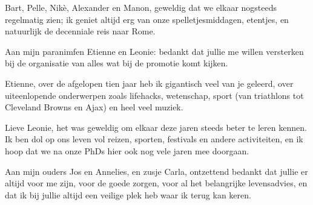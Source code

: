 Bart, Pelle, Nik\`{e}, Alexander en Manon, geweldig dat we elkaar nogsteeds regelmatig zien; ik geniet altijd erg van onze spelletjesmiddagen, etentjes, en natuurlijk de decenniale reis naar Rome. 

Aan mijn paranimfen Etienne en Leonie: bedankt dat jullie me willen versterken bij de organisatie van alles wat bij de promotie komt kijken.

Etienne, over de afgelopen tien jaar heb ik gigantisch veel van je geleerd, over uiteenlopende onderwerpen zoals lifehacks, wetenschap, sport (van triathlons tot Cleveland Browns en Ajax) en heel veel muziek. 

Lieve Leonie, het was geweldig om elkaar deze jaren steeds beter te leren kennen. Ik ben dol op ons leven vol reizen, sporten, festivals en andere activiteiten, en ik hoop dat we na onze PhDs hier ook nog vele jaren mee doorgaan. 

Aan mijn ouders Jos en Annelies, en zusje Carla, ontzettend bedankt dat jullie er altijd voor me zijn, voor de goede zorgen, voor al het belangrijke levensadvies, en dat ik bij jullie altijd een veilige plek heb waar ik terug kan keren. 

